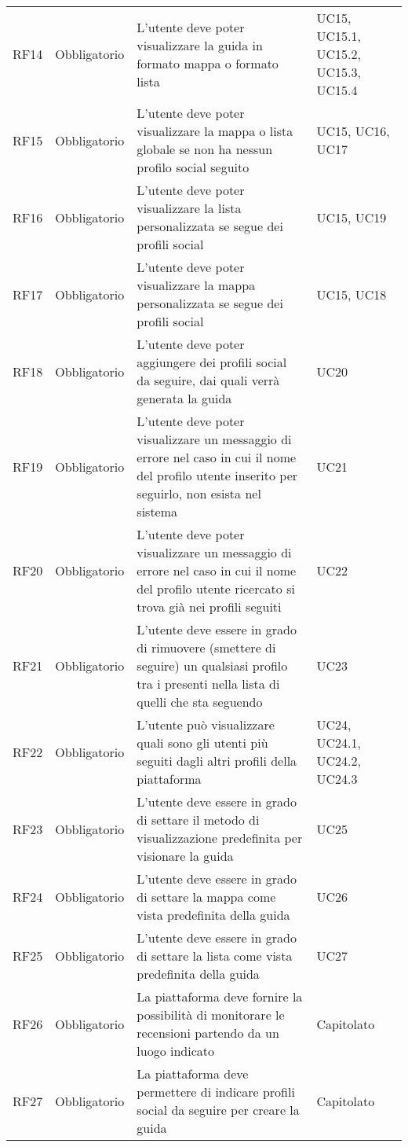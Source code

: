 {\begin{longtable}{C{.15\freewidth} C{.2\freewidth} C{.528\freewidth} C{.15\freewidth}}
      RF14 & Obbligatorio & L'utente deve poter visualizzare la guida in formato mappa o formato lista & UC15, UC15.1, UC15.2, UC15.3, UC15.4 \\
      RF15 & Obbligatorio & L'utente deve poter visualizzare la mappa o lista globale se non ha nessun profilo social seguito & UC15, UC16, UC17 \\
      RF16 & Obbligatorio & L'utente deve poter visualizzare la lista personalizzata se segue dei profili social & UC15, UC19 \\
      RF17 & Obbligatorio & L'utente deve poter visualizzare la mappa personalizzata se segue dei profili social & UC15, UC18 \\
      RF18 & Obbligatorio & L'utente deve poter aggiungere dei profili social da seguire, dai quali verrà generata la guida & UC20 \\
      RF19 & Obbligatorio & L'utente deve poter visualizzare un messaggio di errore nel caso in cui il nome del profilo utente inserito per seguirlo, non esista nel sistema & UC21 \\
      RF20 & Obbligatorio & L'utente deve poter visualizzare un messaggio di errore nel caso in cui il nome del profilo utente ricercato si trova già nei profili seguiti & UC22 \\
      RF21 & Obbligatorio & L'utente deve essere in grado di rimuovere (smettere di seguire) un qualsiasi profilo tra i presenti nella lista di quelli che sta seguendo  & UC23 \\
      RF22 & Obbligatorio & L'utente può visualizzare quali sono gli utenti più seguiti dagli altri profili della piattaforma & UC24, UC24.1, UC24.2, UC24.3 \\
      RF23 & Obbligatorio & L'utente deve essere in grado di settare il metodo di visualizzazione predefinita per visionare la guida & UC25 \\
      RF24 & Obbligatorio & L'utente deve essere in grado di settare la mappa come vista predefinita della guida & UC26 \\
      RF25 & Obbligatorio & L'utente deve essere in grado di settare la lista come vista predefinita della guida & UC27 \\	
      RF26 & Obbligatorio & La piattaforma deve fornire la possibilità di monitorare le recensioni partendo da un luogo indicato & Capitolato \\
      RF27 & Obbligatorio & La piattaforma deve permettere di indicare profili social da seguire per creare la guida & Capitolato \\

\end{longtable}}
